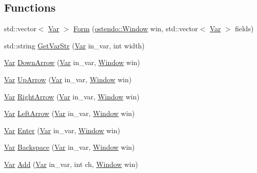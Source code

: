\subsection*{Functions}
\begin{DoxyCompactItemize}
\item 
std\+::vector$<$ \hyperlink{structostendo_1_1Var}{Var} $>$ \hyperlink{namespaceostendo_a6de3757551a0461ef565d035547e4408}{Form} (\hyperlink{classostendo_1_1Window}{ostendo\+::\+Window} win, std\+::vector$<$ \hyperlink{structostendo_1_1Var}{Var} $>$ fields)
\item 
std\+::string \hyperlink{namespaceostendo_a75491bb403d248c50aafc1f5eb310d75}{Get\+Var\+Str} (\hyperlink{structostendo_1_1Var}{Var} in\+\_\+var, int width)
\item 
\hyperlink{structostendo_1_1Var}{Var} \hyperlink{namespaceostendo_a0eff2d6c60790fa96f06511e3a01f3a4}{Down\+Arrow} (\hyperlink{structostendo_1_1Var}{Var} in\+\_\+var, \hyperlink{classostendo_1_1Window}{Window} win)
\item 
\hyperlink{structostendo_1_1Var}{Var} \hyperlink{namespaceostendo_abd61a4387f4057a821127c78c5de14df}{Up\+Arrow} (\hyperlink{structostendo_1_1Var}{Var} in\+\_\+var, \hyperlink{classostendo_1_1Window}{Window} win)
\item 
\hyperlink{structostendo_1_1Var}{Var} \hyperlink{namespaceostendo_a9306123175f6b620de11b774fbfb5ec5}{Right\+Arrow} (\hyperlink{structostendo_1_1Var}{Var} in\+\_\+var, \hyperlink{classostendo_1_1Window}{Window} win)
\item 
\hyperlink{structostendo_1_1Var}{Var} \hyperlink{namespaceostendo_ab912de20925f952a5056414bfbdaeeda}{Left\+Arrow} (\hyperlink{structostendo_1_1Var}{Var} in\+\_\+var, \hyperlink{classostendo_1_1Window}{Window} win)
\item 
\hyperlink{structostendo_1_1Var}{Var} \hyperlink{namespaceostendo_a9279674ead9b9c27ebc228430c1abfbe}{Enter} (\hyperlink{structostendo_1_1Var}{Var} in\+\_\+var, \hyperlink{classostendo_1_1Window}{Window} win)
\item 
\hyperlink{structostendo_1_1Var}{Var} \hyperlink{namespaceostendo_ab4fddb801c2f32c114a4e3ef0c9bc953}{Backspace} (\hyperlink{structostendo_1_1Var}{Var} in\+\_\+var, \hyperlink{classostendo_1_1Window}{Window} win)
\item 
\hyperlink{structostendo_1_1Var}{Var} \hyperlink{namespaceostendo_ac7a01c5f1ce53b6361e62f349f8f5ee4}{Add} (\hyperlink{structostendo_1_1Var}{Var} in\+\_\+var, int ch, \hyperlink{classostendo_1_1Window}{Window} win)
\item 

\end{DoxyCompactItemize}
